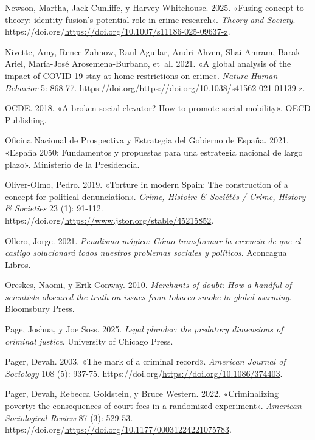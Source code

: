 \documentclass[
  spanish,
  letterpaper,
  DIV=11,
  numbers=noendperiod]{scrreprt}
\newlength{\cslhangindent}
\newenvironment{CSLReferences}[2] %
 {\begin{list}{}{%
  \setlength{\itemindent}{0pt}
  \setlength{\leftmargin}{0pt}
  \setlength{\parsep}{0pt}
  \ifodd #1
   \setlength{\leftmargin}{\cslhangindent}
   \setlength{\itemindent}{-1\cslhangindent}
  \fi
  \setlength{\itemsep}{#2\baselineskip}}}
 {\end{list}}
\begin{document}
\begin{CSLReferences}{1}{0}
Newson, Martha, Jack Cunliffe, y Harvey Whitehouse. 2025. {«Fusing
concept to theory: identity fusion's potential role in crime research»}.
\emph{Theory and Society}.
https://doi.org/\url{https://doi.org/10.1007/s11186-025-09637-z}.

Nivette, Amy, Renee Zahnow, Raul Aguilar, Andri Ahven, Shai Amram, Barak
Ariel, María-José Arosemena-Burbano, et~al. 2021. {«A global analysis of
the impact of COVID-19 stay-at-home restrictions on crime»}.
\emph{Nature Human Behavior} 5: 868-77.
https://doi.org/\url{https://doi.org/10.1038/s41562-021-01139-z}.

OCDE. 2018. {«A broken social elevator? How to promote social
mobility»}. OECD Publishing.

Oficina Nacional de Prospectiva y Estrategia del Gobierno de España.
2021. {«España 2050: Fundamentos y propuestas para una estrategia
nacional de largo plazo»}. Ministerio de la Presidencia.

Oliver-Olmo, Pedro. 2019. {«Torture in modern Spain: The construction of
a concept for political denunciation»}. \emph{Crime, Histoire \&
Sociétés / Crime, History \& Societies} 23 (1): 91-112.
https://doi.org/\url{https://www.jstor.org/stable/45215852}.

Ollero, Jorge. 2021. \emph{Penalismo mágico: Cómo transformar la
creencia de que el castigo solucionará todos nuestros problemas sociales
y políticos}. Aconcagua Libros.

Oreskes, Naomi, y Erik Conway. 2010. \emph{Merchants of doubt: How a
handful of scientists obscured the truth on issues from tobacco smoke to
global warming}. Bloomsbury Press.

Page, Joshua, y Joe Soss. 2025. \emph{Legal plunder: the predatory
dimensions of criminal justice}. University of Chicago Press.

Pager, Devah. 2003. {«The mark of a criminal record»}. \emph{American
Journal of Sociology} 108 (5): 937-75.
https://doi.org/\url{https://doi.org/10.1086/374403}.

Pager, Devah, Rebecca Goldstein, y Bruce Western. 2022. {«Criminalizing
poverty: the consequences of court fees in a randomized experiment»}.
\emph{American Sociological Review} 87 (3): 529-53.
https://doi.org/\url{https://doi.org/10.1177/00031224221075783}.


\end{CSLReferences}
\end{document}
